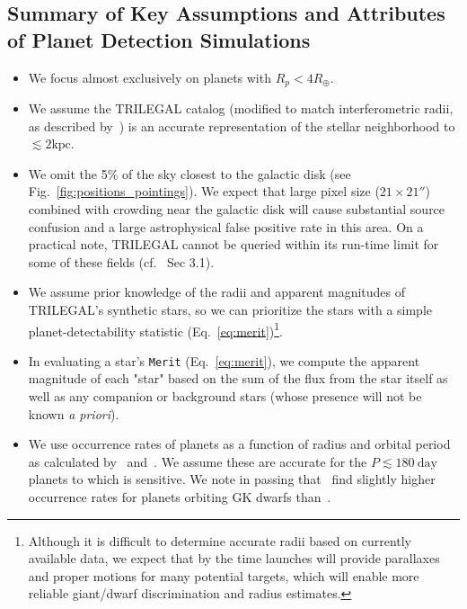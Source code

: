 \subsection{Summary of Key Assumptions and Attributes of Planet Detection 
Simulations}
\label{sec:input_assumptions}

\begin{itemize}
  
	\item We focus almost exclusively on planets with $R_p < 4R_\oplus$.

        \item We assume the TRILEGAL catalog (modified to match
          interferometric radii, as described
          by~) is an accurate representation
          of the stellar neighborhood to $\lesssim2\text{kpc}$.

        \item We omit the 5\% of the sky closest to the galactic disk
          (see Fig.~\ref{fig:positions_pointings}). We expect that
          \tesss large pixel size ($21\times21''$) combined with
          crowding near the galactic disk will cause substantial
          source confusion and a large astrophysical false positive
          rate in this area.  On a practical note, TRILEGAL cannot be
          queried within its run-time limit for some of these fields
          (cf.~ Sec 3.1).
        
	\item We assume prior knowledge of the radii and apparent
          magnitudes of TRILEGAL's synthetic stars, so we can
          prioritize the stars with a simple planet-detectability statistic
          (Eq.~\ref{eq:merit})\footnote{Although it is difficult to determine
            accurate radii based on currently available data, we expect that by the time
            \tess launches \gaia will provide parallaxes and proper
            motions for many potential \tess targets, which will enable more reliable giant/dwarf discrimination and radius estimates.}.
          
	\item In evaluating a star's \texttt{Merit}
          (Eq.~\ref{eq:merit}), we compute the apparent magnitude of each "star"
          based on the sum of the flux from the star
          itself as well as any companion or background stars
          (whose presence will not be known {\it a priori}).
	            
	\item We use occurrence rates of planets as a function of radius
          and orbital period as calculated by~\citet{fressin_false_2013}
          and~\citet{dressing_occurrence_2015}.
          We assume these are accurate for the 
          $P \lesssim 180\ \text{day}$ planets to which \tess is 
          sensitive. We note in passing that~\citet{burke_terrestrial_2015} 
          find slightly higher occurrence rates for planets orbiting GK dwarfs 
          than~\citet{fressin_false_2013}.
          

\end{itemize}
